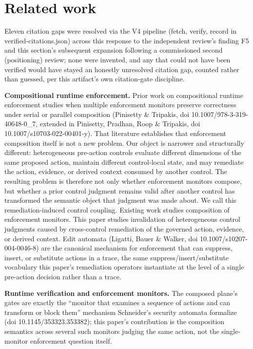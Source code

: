 \documentclass[11pt,a4paper]{article}
\theoremstyle{definition}
\begin{document}
\section{Related work}

Eleven citation gaps were resolved via the V4 pipeline (fetch, verify, record in verified-citations.json) across this response to the independent review's finding F5 and this section's subsequent expansion following a commissioned second (positioning) review; none were invented, and any that could not have been verified would have stayed an honestly unresolved citation gap, counted rather than guessed, per this artifact's own citation-gate discipline.

\noindent\textbf{Compositional runtime enforcement.} Prior work on compositional runtime enforcement studies when multiple enforcement monitors preserve correctness under serial or parallel composition (Pinisetty \& Tripakis, doi 10.1007/978-3-319-40648-0\_7, extended in Pinisetty, Pradhan, Roop \& Tripakis, doi 10.1007/s10703-022-00401-y). That literature establishes that enforcement composition itself is not a new problem. Our object is narrower and structurally different: heterogeneous pre-action controls evaluate different dimensions of the same proposed action, maintain different control-local state, and may remediate the action, evidence, or derived context consumed by another control. The resulting problem is therefore not only whether enforcement monitors compose, but whether a prior control judgment remains valid after another control has transformed the semantic object that judgment was made about. We call this remediation-induced control coupling. Existing work studies composition of enforcement monitors. This paper studies invalidation of heterogeneous control judgments caused by cross-control remediation of the governed action, evidence, or derived context. Edit automata (Ligatti, Bauer \& Walker, doi 10.1007/s10207-004-0046-8) are the canonical mechanism for enforcement that can suppress, insert, or substitute actions in a trace, the same suppress/insert/substitute vocabulary this paper's remediation operators instantiate at the level of a single pre-action decision rather than a trace.

\noindent\textbf{Runtime verification and enforcement monitors.} The composed plane's gates are exactly the ``monitor that examines a sequence of actions and can transform or block them'' mechanism Schneider's security automata formalize (doi 10.1145/353323.353382); this paper's contribution is the composition semantics across several such monitors judging the same action, not the single-monitor enforcement question itself.
\end{document}
